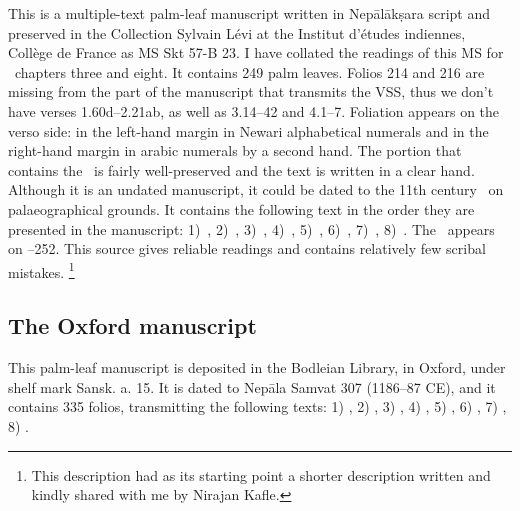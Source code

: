 This is a multiple-text palm-leaf manuscript written in 
Nepālākṣara script and preserved in the 
Collection Sylvain Lévi at the Institut d'études
indiennes, Collège de France as MS Skt 57-B 23. 
I have collated the readings of this MS for \VSS\ 
chapters three and eight.
It contains 249 palm leaves. %
Folios 214 and 216 are missing from the 
part of the manuscript that transmits the VSS,
thus we don't have verses 1.60d--2.21ab, as well as
3.14--42 and 4.1--7.
Foliation appears on the verso side: in the left-hand margin in
Newari alphabetical numerals and in the right-hand margin 
in arabic numerals by a second hand. 
The portion that contains the \VSS\ is fairly well-preserved and
the text is written in a clear hand. Although it is an undated manuscript, it could be dated to the 11th century \CE\ on palaeographical grounds. 
It contains the following text in the order they are presented in the manuscript:
1)~\SDhS, %
2)~\SDhU, %
3)~\SDhSangr, %
4)~\Ums, %
5)~\SivaUp, %
6)~\Uums, %
7)~\Vss, %
8)~\DharmP. %
The \VSS\ appears on --252.
This source gives reliable readings and contains
relatively few scribal mistakes.%
	\footnote{This description had as its starting point a
			          shorter description written and kindly
			          shared with me by Nirajan Kafle.}









\medskip
\subsection{The Oxford manuscript}

This palm-leaf manuscript is deposited in the Bodleian Library, in Oxford, 
under shelf mark %
Sansk. a. 15. It is dated to Nepāla Samvat 307 (1186--87 CE),
and it contains 335 folios, transmitting the following texts: 
1) \SDhS, %
2) \SDhU,
3) \SDhSangr, %
4) \Ums, %
5) \SivaUp, %
6) \Uums, %
7) \Vss, %
8) \DharmP. %

